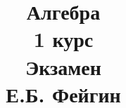 \documentclass[fleqn]{article}
\title{Алгебра \\ 1 курс \\ Экзамен \\ Е.Б. Фейгин}
\date{}
\begin{document}
	\maketitle
	\pagebreak	
	\tableofcontents
	
	
	
\end{document}
